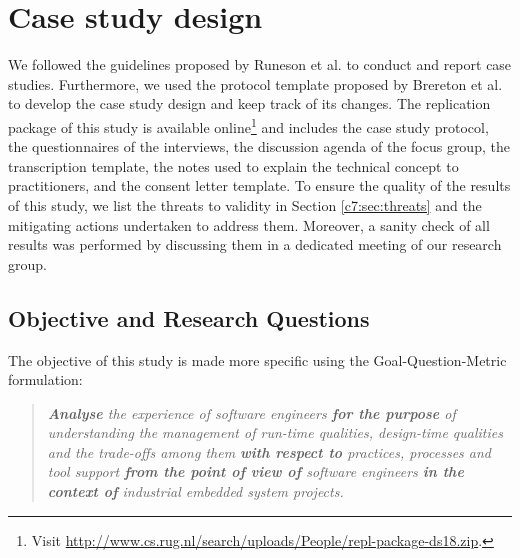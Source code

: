 \section{Case study design}\label{c7:sec:case-study}
We followed the guidelines proposed by Runeson et al. \cite{Runeson2012} to conduct and report case studies.
Furthermore, we used the protocol template proposed by Brereton et al. \cite{Brereton2008} to develop the case study design and keep track of its changes. 
The replication package of this study is available online\footnote{Visit \url{http://www.cs.rug.nl/search/uploads/People/repl-package-ds18.zip}. } and includes the case study protocol, the questionnaires of the interviews, the discussion agenda of the focus group, the transcription template, the notes used to explain the technical concept to practitioners, and the consent letter template.
To ensure the quality of the results of this study, we list the threats to validity in Section \ref{c7:sec:threats} and the mitigating actions undertaken to address them.
Moreover, a sanity check of all  results was performed by discussing them in a dedicated meeting of our research group.

\subsection{Objective and Research Questions}\label{c7:sec:objectives-rq}
The objective of this study is made more specific using the Goal-Question-Metric \cite{VanSolingen2002} formulation:
\begin{quote}\textit{
    \textbf{Analyse} the experience of software engineers \textbf{for the purpose} of understanding the management of run-time qualities, design-time qualities and the trade-offs among them \textbf{with respect to} practices, processes and tool support \textbf{from the point of view of} software engineers \textbf{in the context of} industrial embedded system projects.}
\end{quote}

